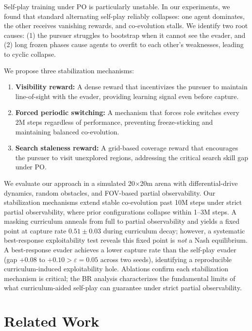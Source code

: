 \documentclass[letterpaper, 10 pt, conference]{ieeeconf}
\begin{document}
Self-play training under PO is particularly unstable. In our experiments, we found that
standard alternating self-play reliably collapses: one agent dominates, the other receives
vanishing rewards, and co-evolution stalls. We identify two root causes: (1) the pursuer
struggles to bootstrap when it cannot see the evader, and (2) long frozen phases cause
agents to overfit to each other's weaknesses, leading to cyclic collapse.

We propose three stabilization mechanisms:
\begin{enumerate}
    \item \textbf{Visibility reward:} A dense reward that incentivizes the pursuer to maintain
    line-of-sight with the evader, providing learning signal even before capture.
    \item \textbf{Forced periodic switching:} A mechanism that forces role switches every
    2M steps regardless of performance, preventing freeze-sticking and maintaining
    balanced co-evolution.
    \item \textbf{Search staleness reward:} A grid-based coverage reward that encourages
    the pursuer to visit unexplored regions, addressing the critical search skill gap
    under PO.
\end{enumerate}

We evaluate our approach in a simulated 20$\times$20m arena with differential-drive dynamics,
random obstacles, and FOV-based partial observability. Our stabilization mechanisms extend
stable co-evolution past 10M steps under strict partial observability, where prior configurations
collapse within 1--3M steps. A masking curriculum anneals from full to partial observability
and yields a fixed point at capture rate $0.51 \pm 0.03$ during curriculum decay; however,
a systematic best-response exploitability test reveals this fixed point is \emph{not} a Nash
equilibrium. A best-response evader achieves a lower capture rate than the self-play evader
(gap $+0.08$ to $+0.10 > \varepsilon=0.05$ across two seeds), identifying a reproducible
curriculum-induced exploitability hole. Ablations confirm each stabilization mechanism is
critical; the BR analysis characterizes the fundamental limits of what curriculum-aided
self-play can guarantee under strict partial observability.

\section{Related Work}
\label{sec:related_work}
\end{document}
